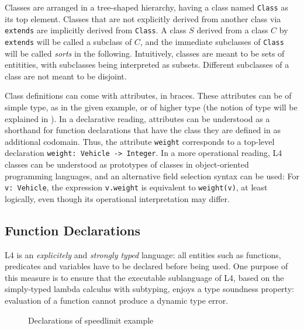 Classes are arranged in a tree-shaped hierarchy, having a class named
\texttt{Class} as its top element. Classes that are not explicitly derived
from another class via \texttt{extends} are implicitly derived from
\texttt{Class}. A class $S$ derived from a class $C$ by \texttt{extends} will
be called a subclass of $C$, and the immediate subclasses of \texttt{Class}
will be called \emph{sorts} in the following. Intuitively, classes are meant
to be sets of entitities, with subclasses being interpreted as
subsets. Different subclasses of a class are not meant to be disjoint.

Class definitions can come with attributes, in braces. These attributes can be
of simple type, as in the given example, or of higher type (the notion of type
will be explained in ). In a declarative reading,
attributes can be understood as a shorthand for function declarations that
have the class they are defined in as additional codomain. Thus, the attribute
\texttt{weight} corresponds to a top-level declaration \texttt{weight: Vehicle
  -> Integer}. In a more operational reading, L4 classes can be understood as
prototypes of classes in object-oriented programming languages, and an
alternative field selection syntax can be used: For \texttt{v: Vehicle}, the
expression \texttt{v.weight} is equivalent to \texttt{weight(v)}, at least
logically, even though its operational interpretation may differ.


\subsection{Function Declarations}\label{sec:fundecls}

L4 is an \emph{explicitely} and \emph{strongly typed} language: all entities
such as functions, predicates and variables have to be declared before being
used. One purpose of this measure is to ensure that the executable sublanguage
of L4, based on the simply-typed lambda calculus with subtyping, enjoys a type
soundness property: evaluation of a function cannot produce a dynamic type
error.



\begin{figure}[h]
\begin{framed}

\begin{alltt}
\end{alltt}

\end{framed}
  \caption{Declarations of speedlimit example}\label{fig:fundecls}
\end{figure}




